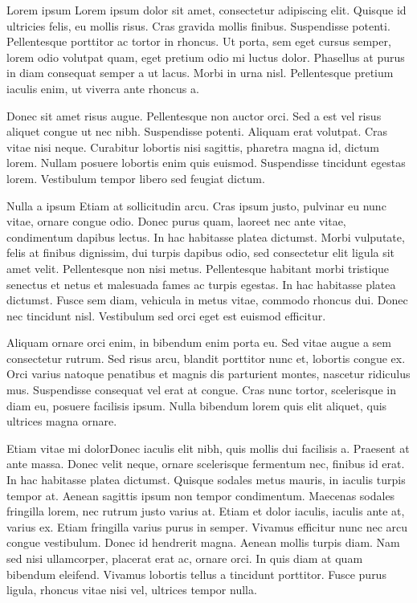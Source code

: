 \documentclass[draft]{article}
\begin{document}
\begin{anfxnote}{Lorem ipsum}
  Lorem ipsum dolor sit amet, consectetur adipiscing elit. Quisque id
  ultricies felis, eu mollis risus. Cras gravida mollis finibus. Suspendisse
  potenti.  Pellentesque porttitor ac tortor in rhoncus. Ut porta, sem eget
  cursus semper, lorem odio volutpat quam, eget pretium odio mi luctus dolor.
  Phasellus at purus in diam consequat semper a ut lacus. Morbi in urna nisl.
  Pellentesque pretium iaculis enim, ut viverra ante rhoncus a.
\end{anfxnote}

Donec sit amet risus augue. Pellentesque non auctor orci. Sed a est vel risus
aliquet congue ut nec nibh. Suspendisse potenti. Aliquam erat volutpat.
 Cras vitae nisi neque. Curabitur lobortis nisi sagittis,
pharetra magna id, dictum lorem. Nullam posuere lobortis enim quis euismod.
Suspendisse tincidunt egestas lorem. Vestibulum tempor libero sed feugiat
dictum.

\begin{anfxwarning}{Nulla a ipsum}
  Etiam at sollicitudin arcu. Cras ipsum justo, pulvinar eu nunc vitae, ornare
  congue odio. Donec purus quam, laoreet nec ante vitae, condimentum dapibus
  lectus. In hac habitasse platea dictumst. Morbi vulputate, felis at finibus
  dignissim, dui turpis dapibus odio, sed consectetur elit ligula sit amet
  velit.  Pellentesque non nisi metus. Pellentesque habitant morbi tristique
  senectus et netus et malesuada fames ac turpis egestas. In hac habitasse
  platea dictumst.  Fusce sem diam, vehicula in metus vitae, commodo rhoncus
  dui. Donec nec tincidunt nisl. Vestibulum sed orci eget est euismod efficitur.
\end{anfxwarning}

Aliquam ornare orci enim, in bibendum enim porta eu. Sed vitae augue a sem
consectetur rutrum. Sed risus arcu, blandit porttitor nunc et, lobortis congue
ex.
Orci varius natoque penatibus et magnis dis parturient montes, nascetur
ridiculus mus. Suspendisse consequat vel erat at congue. Cras nunc tortor,
scelerisque in diam eu, posuere facilisis ipsum. Nulla bibendum lorem quis elit
aliquet, quis ultrices magna ornare.
\begin{anfxnote*}{Etiam vitae mi dolor}{Donec iaculis elit nibh, quis mollis dui facilisis a. }
  Praesent at ante massa. Donec velit neque, ornare scelerisque fermentum nec,
  finibus id erat. In hac habitasse platea dictumst.  Quisque sodales metus
  mauris, in iaculis turpis tempor at. Aenean sagittis ipsum non tempor
  condimentum. Maecenas sodales fringilla lorem, nec rutrum justo varius at.
  Etiam et dolor iaculis, iaculis ante at, varius ex. Etiam fringilla varius
  purus in semper. Vivamus efficitur nunc nec arcu congue vestibulum. Donec id
  hendrerit magna. Aenean mollis turpis diam. Nam sed nisi ullamcorper, placerat
  erat ac, ornare orci. In quis diam at quam bibendum eleifend. Vivamus lobortis
  tellus a tincidunt porttitor. Fusce purus ligula, rhoncus vitae nisi vel,
  ultrices tempor nulla.
\end{anfxnote*}
\end{document}
